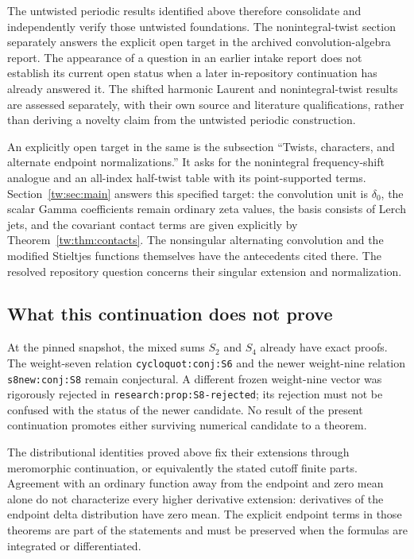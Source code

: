 The untwisted periodic results identified above therefore consolidate and
independently verify those untwisted foundations. The nonintegral-twist
section separately answers the explicit open target in the archived
convolution-algebra report.  The appearance of a
question in an earlier intake report does not establish its current open
status when a later in-repository continuation has already answered it.
The shifted harmonic Laurent and nonintegral-twist results are assessed
separately, with their own source and literature qualifications, rather
than deriving a novelty claim from the untwisted periodic construction.

An explicitly open target in the same
 is the subsection
``Twists, characters, and alternate endpoint normalizations.''
It asks for the nonintegral frequency-shift analogue and an all-index
half-twist table with its point-supported terms.
Section~\ref{tw:sec:main} answers this specified target: the convolution
unit is $\delta_0$, the scalar Gamma coefficients remain ordinary zeta
values, the basis consists of Lerch jets, and the covariant contact
terms are given explicitly by Theorem~\ref{tw:thm:contacts}.
The nonsingular alternating convolution and the modified Stieltjes
functions themselves have the antecedents cited there.  The resolved
repository question concerns their singular extension and normalization.

\subsection{What this continuation does not prove}

At the pinned snapshot, the mixed sums $S_2$ and $S_4$ already have
exact proofs.  The weight-seven relation
\texttt{cycloquot:conj:S6} and the newer weight-nine relation
\texttt{s8new:conj:S8} remain conjectural.  A different frozen
weight-nine vector was rigorously rejected in
\texttt{research:prop:S8-rejected}; its rejection must not be confused
with the status of the newer candidate.  No result of the present
continuation promotes either surviving numerical candidate to a theorem.

The distributional identities proved above fix their extensions through
meromorphic continuation, or equivalently the stated cutoff finite parts.
Agreement with an ordinary function away from the endpoint and zero mean
alone do not characterize every higher derivative extension: derivatives
of the endpoint delta distribution have zero mean.  The explicit endpoint
terms in those theorems are part of the statements and must be preserved
when the formulas are integrated or differentiated.

